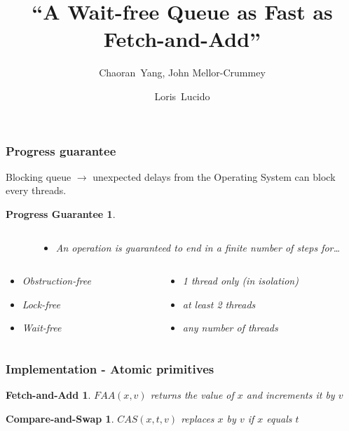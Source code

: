 \documentclass[10pt,a4paper]{beamer}
\title{``A Wait-free Queue as Fast as Fetch-and-Add'' }
\subtitle{Chaoran~Yang, John Mellor-Crummey}
\author[L. Lucido]{Loris~Lucido\\[-.25em]}
\date{\displaydate{date}}
\begin{document}
\begin{frame}
  \vspace{3.5em}
  \titlepage
\end{frame}


\begin{frame}
  \frametitle{Progress guarantee}
  Blocking queue $\rightarrow$ unexpected delays from the Operating System
  can block every threads. \center \vfill
  \newtheorem{progress}[theorem]{Progress Guarantee}
  \begin{progress}
    \center
    \begin{columns}
      \begin{column}{0.3\textwidth}
      \end{column}
      \begin{column}{0.7\textwidth}
        \begin{itemize}
        \item[] An operation is guaranteed to end in a finite number of steps for\ldots
        \end{itemize}
      \end{column}
    \end{columns}
    \medskip
    \begin{columns}
      \begin{column}{0.3\textwidth}
        \begin{itemize}
        \item Obstruction-free
        \item Lock-free
        \item Wait-free
        \end{itemize}
      \end{column}
      \begin{column}{0.7\textwidth}
        \begin{itemize}
        \item[] 1 thread only (in isolation)
        \item[] at least 2 threads
        \item[] any number of threads
        \end{itemize}
      \end{column}
    \end{columns}
  \end{progress}
\end{frame}

\begin{frame}
  \frametitle{Implementation - Atomic primitives}
  \newtheorem{faa}[theorem]{Fetch-and-Add}
  \newtheorem{cas}[theorem]{Compare-and-Swap}
  \begin{faa}
    $FAA(x, v)$ returns the value of $x$ and increments it by $v$
  \end{faa}
  \vfill
  \begin{cas}
    $CAS(x,t,v)$ replaces $x$ by $v$ if $x$ equals $t$
  \end{cas}
\end{frame}
\end{document}

